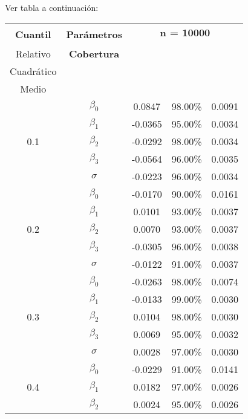 Ver tabla a continuación:

\begin{longtable}[c]{|c|c|c|c|c|}
\hline
\multirow{2}{*}{\textbf{Cuantil}} & \multirow{2}{*}{\textbf{Parámetros}} & \multicolumn{3}{c|}{\textbf{n = 10000}} \\ \cline{3-5} 
 &  & \textbf{\begin{tabular}[c]{@{}c@{}}Sesgo \\ Relativo\end{tabular}} & \textbf{Cobertura} & \textbf{\begin{tabular}[c]{@{}c@{}}Error \\ Cuadrático \\ Medio\end{tabular}} \\ \hline
\endhead
%
\multirow{5}{*}{0.1} & $\beta_0$ & 0.0847 & 98.00\% & 0.0091 \\ \cline{2-5} 
 & $\beta_1$ & -0.0365 & 95.00\% & 0.0034 \\ \cline{2-5} 
 & $\beta_2$ & -0.0292 & 98.00\% & 0.0034 \\ \cline{2-5} 
 & $\beta_3$ & -0.0564 & 96.00\% & 0.0035 \\ \cline{2-5} 
 & $\sigma$ & -0.0223 & 96.00\% & 0.0034 \\ \hline
\multirow{5}{*}{0.2} & $\beta_0$ & -0.0170 & 90.00\% & 0.0161 \\ \cline{2-5} 
 & $\beta_1$ & 0.0101 & 93.00\% & 0.0037 \\ \cline{2-5} 
 & $\beta_2$ & 0.0070 & 93.00\% & 0.0037 \\ \cline{2-5} 
 & $\beta_3$ & -0.0305 & 96.00\% & 0.0038 \\ \cline{2-5} 
 & $\sigma$ & -0.0122 & 91.00\% & 0.0037 \\ \hline
\multirow{5}{*}{0.3} & $\beta_0$ & -0.0263 & 98.00\% & 0.0074 \\ \cline{2-5} 
 & $\beta_1$ & -0.0133 & 99.00\% & 0.0030 \\ \cline{2-5} 
 & $\beta_2$ & 0.0104 & 98.00\% & 0.0030 \\ \cline{2-5} 
 & $\beta_3$ & 0.0069 & 95.00\% & 0.0032 \\ \cline{2-5} 
 & $\sigma$ & 0.0028 & 97.00\% & 0.0030 \\ \hline
\multirow{5}{*}{0.4} & $\beta_0$ & -0.0229 & 91.00\% & 0.0141 \\ \cline{2-5} 
 & $\beta_1$ & 0.0182 & 97.00\% & 0.0026 \\ \cline{2-5} 
 & $\beta_2$ & 0.0024 & 95.00\% & 0.0026 \\ \cline{2-5} 

\end{longtable}
